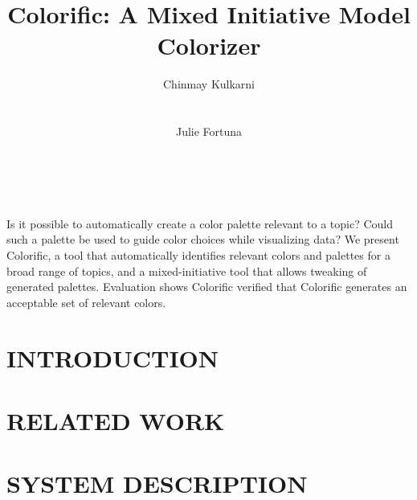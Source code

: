 \documentclass{chi2011}
\newcommand{\system}{Colorific\xspace}
\begin{document}

 \toappear{}


\title{\system: A Mixed Initiative Model Colorizer}

\author{
  \alignauthor Chinmay Kulkarni\\
    \\
    \\
  \alignauthor Julie Fortuna\\
    \\
    \\
}

\maketitle

\abstract
Is it possible to automatically create a color palette relevant to a topic? Could such a palette be used to guide color choices while visualizing data? We present \system, a tool that automatically identifies relevant colors and palettes for a broad range of topics, and a mixed-initiative tool that allows tweaking of generated palettes. Evaluation shows \system verified that \system generates an acceptable set of relevant colors.



\section{INTRODUCTION}


\section{RELATED WORK}

\section{SYSTEM DESCRIPTION}

\end{document}
